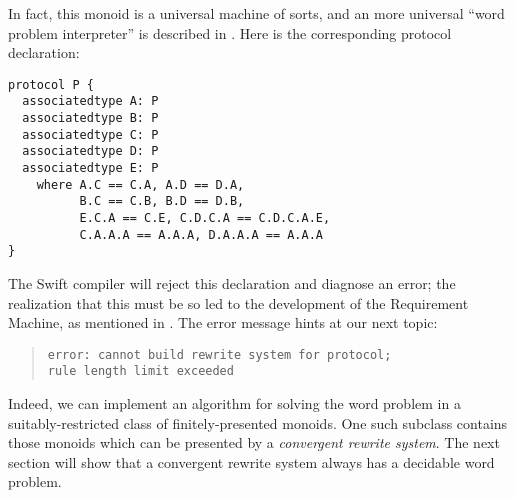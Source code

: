 \documentclass[../generics]{subfiles}
\begin{document}
In fact, this monoid is a universal machine of sorts, and an more universal ``word problem interpreter'' is described in \cite{universalsemigroup}. Here is the corresponding protocol declaration:
\begin{Verbatim}
protocol P {
  associatedtype A: P
  associatedtype B: P
  associatedtype C: P
  associatedtype D: P
  associatedtype E: P
    where A.C == C.A, A.D == D.A,
          B.C == C.B, B.D == D.B,
          E.C.A == C.E, C.D.C.A == C.D.C.A.E,
          C.A.A.A == A.A.A, D.A.A.A == A.A.A
}
\end{Verbatim}
The Swift compiler will reject this declaration and diagnose an error; the realization that this must be so led to the development of the Requirement Machine, as mentioned in . The error message hints at our next topic:
\begin{quote}
\begin{verbatim}
error: cannot build rewrite system for protocol;
rule length limit exceeded
\end{verbatim}
\end{quote}
Indeed, we can implement an algorithm for solving the word problem in a suitably-restricted class of finitely-presented monoids. One such subclass contains those monoids which can be presented by a \emph{convergent rewrite system}. The next section will show that a convergent rewrite system always has a decidable word problem.
\end{document}
